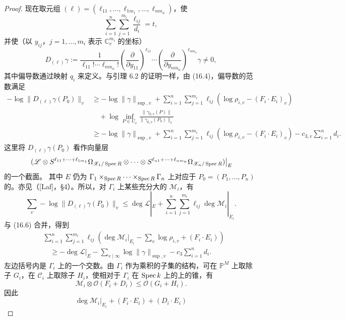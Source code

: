 \begin{proof}
现在取元组 $(\ell)=(\ell_{11},\ldots,\ell_{1m_1},\ldots,\ell_{nm_n})$，使
\begin{equation*}\tag{16.5}
\sum_{i=1}^n\sum_{j=1}^{m_i}\frac{\ell_{ij}}{d_i}=t,
\end{equation*}
并使（以 $y_{ij}$，$j=1,\ldots,m_i$ 表示 $\mathbb C_v^{m_i}$ 的坐标）
\[
D_{(\ell)}\gamma:=\frac1{\ell_{11}!\cdots\ell_{nm_n}!}
\left(\frac\partial{\partial y_{11}}\right)^{\ell_{11}}\cdots
\left(\frac\partial{\partial y_{nm_n}}\right)^{\ell_{nm_n}}\gamma\ne0,
\]
其中偏导数通过映射 $q_i$ 来定义。与引理 6.2 的证明一样，由 (16.4)，偏导数的范数满足
\begin{align*}\tag{16.6}
-\log\|D_{(\ell)}\gamma(P_0)\|_v
&\ge-\log\|\gamma\|_{\sup,v}
+\sum_{i=1}^n\sum_{j=1}^{m_i}\ell_{ij}(\log\rho_{i,v}-(F_i\cdot E_i)_v)\\
&\quad+\log\inf_{P\in U_v}\frac{\|\gamma_{0,v}(P)\|}{\|\gamma_{0,v}(P_0)\|_v}\\
&\ge-\log\|\gamma\|_{\sup,v}
+\sum_{i=1}^n\sum_{j=1}^{m_i}\ell_{ij}(\log\rho_{i,v}-(F_i\cdot E_i)_v)
-c_{3,v}\sum_{i=1}^n d_i.
\end{align*}
这里将 $D_{(\ell)}\gamma(P_0)$ 看作向量层
\[
\left.(\mathscr L\otimes S^{\ell_{11}+\cdots+\ell_{1m_1}}\Omega_{\mathscr X_1/\operatorname{Spec} R}
\otimes\cdots\otimes S^{\ell_{n1}+\cdots+\ell_{nm_n}}\Omega_{\mathscr X_n/\operatorname{Spec} R})\right|_E
\]
的一个截面。
其中 $E$ 仍为 $\Gamma_1\times_{\operatorname{Spec} R}\cdots\times_{\operatorname{Spec} R}\Gamma_n$ 上对应于 $P_0=(P_1,\ldots,P_n)$ 的。亦见（[Laf]，§4）。所以，对 $\Gamma_i$ 上某些充分大的 $\mathscr M_i$，有
\[
\sum_v-\log\|D_{(\ell)}\gamma(P_0)\|_v
\le\deg\mathscr L|_E+\sum_{i=1}^n\sum_{j=1}^{m_i}\ell_{ij}\deg\mathscr M_i|_{E_i}.
\]
与 (16.6) 合并，得到
\begin{align*}\tag{16.7}
&\sum_{i=1}^n\sum_{j=1}^{m_i}\ell_{ij}
\left(\deg\mathscr M_i|_{E_i}-\sum_v\log\rho_{i,v}+(F_i\cdot E_i)\right)\\
&\quad\ge-\deg\mathscr L|_E-\sum_{v\mid\infty}\log\|\gamma\|_{\sup,v}-c_3\sum_{i=1}^n d_i.
\end{align*}
左边括号内是 $\Gamma_i$ 上的一个交数。由 $\Gamma_i$ 作为乘积的子集的结构，可在 $\mathbb P^M$ 上取除子 $G_i$，在 $\mathscr C_i$ 上取除子 $H_i$，使相对于 $\Gamma_i$ 在 $\operatorname{Spec} k$ 上的上的锥，有
\[
\mathscr M_i\otimes\mathcal O(F_i+D_i)\le\mathcal O(G_i+H_i).
\]
因此
\[
\deg\mathscr M_i|_{E_i}+(F_i\cdot E_i)+(D_i\cdot E_i)
\]
\end{proof}
